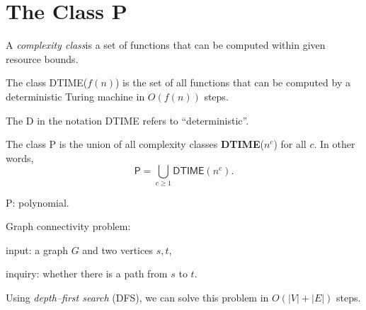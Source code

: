 \section{The Class \textsf{P}} 

A \textit{complexity class}is a set of functions that can be computed within given resource bounds.





\begin{df}
    The class \textsf{DTIME}($f(n)$) is the set of all functions that can be computed by a deterministic Turing machine in $O(f(n))$ steps.
\end{df}

The \textsf{D} in the notation \textsf{DTIME} refers to ``deterministic''.



\begin{df}
    The class \textsf{P} is the union of all complexity classes \textbf{DTIME}($n^c$) for all  $c$.
    In other words,
    \[
        \mathsf{P} = \bigcup_{c \geq 1} \mathsf{DTIME}(n^c).
    \]
\end{df}


P: polynomial.



\begin{example}
    Graph connectivity problem: 
    
    input: a graph $G$ and two vertices $s,t$, 
    
    inquiry: whether there is a path from $s$ to $t$.

    Using \textit{depth--first search} (DFS), 
    we can solve this problem in $O(|V|+|E|)$ steps.
\end{example}




